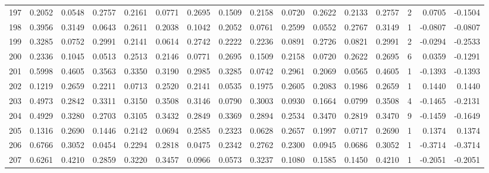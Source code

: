 \begin{tabular}{lrrrrrrrrrrrrrrr}
197 &      0.2052 &  0.0548 &  0.2757 &  0.2161 &  0.0771 &  0.2695 &  0.1509 &  0.2158 &  0.0720 &  0.2622 &   0.2133 &     0.2757 &      2 &                    0.0705 &                    -0.1504 \\
198 &      0.3956 &  0.3149 &  0.0643 &  0.2611 &  0.2038 &  0.1042 &  0.2052 &  0.0761 &  0.2599 &  0.0552 &   0.2767 &     0.3149 &      1 &                   -0.0807 &                    -0.0807 \\
199 &      0.3285 &  0.0752 &  0.2991 &  0.2141 &  0.0614 &  0.2742 &  0.2222 &  0.2236 &  0.0891 &  0.2726 &   0.0821 &     0.2991 &      2 &                   -0.0294 &                    -0.2533 \\
200 &      0.2336 &  0.1045 &  0.0513 &  0.2513 &  0.2146 &  0.0771 &  0.2695 &  0.1509 &  0.2158 &  0.0720 &   0.2622 &     0.2695 &      6 &                    0.0359 &                    -0.1291 \\
201 &      0.5998 &  0.4605 &  0.3563 &  0.3350 &  0.3190 &  0.2985 &  0.3285 &  0.0742 &  0.2961 &  0.2069 &   0.0565 &     0.4605 &      1 &                   -0.1393 &                    -0.1393 \\
202 &      0.1219 &  0.2659 &  0.2211 &  0.0713 &  0.2520 &  0.2141 &  0.0535 &  0.1975 &  0.2605 &  0.2083 &   0.1986 &     0.2659 &      1 &                    0.1440 &                     0.1440 \\
203 &      0.4973 &  0.2842 &  0.3311 &  0.3150 &  0.3508 &  0.3146 &  0.0790 &  0.3003 &  0.0930 &  0.1664 &   0.0799 &     0.3508 &      4 &                   -0.1465 &                    -0.2131 \\
204 &      0.4929 &  0.3280 &  0.2703 &  0.3105 &  0.3432 &  0.2849 &  0.3369 &  0.2894 &  0.2534 &  0.3470 &   0.2819 &     0.3470 &      9 &                   -0.1459 &                    -0.1649 \\
205 &      0.1316 &  0.2690 &  0.1446 &  0.2142 &  0.0694 &  0.2585 &  0.2323 &  0.0628 &  0.2657 &  0.1997 &   0.0717 &     0.2690 &      1 &                    0.1374 &                     0.1374 \\
206 &      0.6766 &  0.3052 &  0.0454 &  0.2294 &  0.2818 &  0.0475 &  0.2342 &  0.2762 &  0.2300 &  0.0945 &   0.0686 &     0.3052 &      1 &                   -0.3714 &                    -0.3714 \\
207 &      0.6261 &  0.4210 &  0.2859 &  0.3220 &  0.3457 &  0.0966 &  0.0573 &  0.3237 &  0.1080 &  0.1585 &   0.1450 &     0.4210 &      1 &                   -0.2051 &                    -0.2051 \\

\end{tabular}
